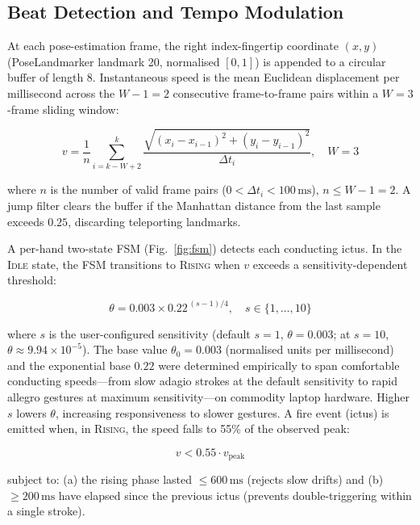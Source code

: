 \documentclass[conference]{IEEEtran}
\begin{document}
\subsection{Beat Detection and Tempo Modulation}
\label{sec:beatdetect}

At each pose-estimation frame, the right index-fingertip coordinate
$(x, y)$ (PoseLandmarker landmark 20, normalised $[0,1]$) is appended
to a circular buffer of length 8. Instantaneous speed is the mean
Euclidean displacement per millisecond across the $W-1 = 2$ consecutive
frame-to-frame pairs within a $W = 3$-frame sliding window:

\begin{equation}
  v = \frac{1}{n} \sum_{i=k-W+2}^{k}
      \frac{\sqrt{(x_i - x_{i-1})^2 + (y_i - y_{i-1})^2}}{\Delta t_i},
  \quad W = 3
  \label{eq:speed}
\end{equation}

\noindent where $n$ is the number of valid frame pairs
($0 < \Delta t_i < 100\,\text{ms}$), $n \leq W - 1 = 2$. A jump filter clears the buffer if the Manhattan distance
from the last sample exceeds $0.25$, discarding teleporting landmarks.

A per-hand two-state FSM (Fig.~\ref{fig:fsm}) detects each conducting
ictus. In the \textsc{Idle} state, the FSM transitions to
\textsc{Rising} when $v$ exceeds a sensitivity-dependent threshold:

\begin{equation}
  \theta = 0.003 \times 0.22^{\,(s-1)/4}, \quad s \in \{1,\ldots,10\}
  \label{eq:threshold}
\end{equation}

\noindent where $s$ is the user-configured sensitivity (default $s=1$,
$\theta = 0.003$; at $s=10$, $\theta \approx 9.94 \times 10^{-5}$). The base
value $\theta_0 = 0.003$ (normalised units per millisecond) and the
exponential base $0.22$ were determined empirically to span comfortable
conducting speeds---from slow adagio strokes at the default sensitivity
to rapid allegro gestures at maximum sensitivity---on commodity laptop
hardware. Higher $s$ lowers $\theta$, increasing responsiveness to
slower gestures. A fire event (ictus) is emitted when, in
\textsc{Rising}, the speed falls to 55\% of the observed peak:

\begin{equation}
  v < 0.55 \cdot v_{\text{peak}}
  \label{eq:fire}
\end{equation}

\noindent subject to: (a) the rising phase lasted $\leq 600\,\text{ms}$
(rejects slow drifts) and (b) $\geq 200\,\text{ms}$ have elapsed since
the previous ictus (prevents double-triggering within a single stroke).
\end{document}
